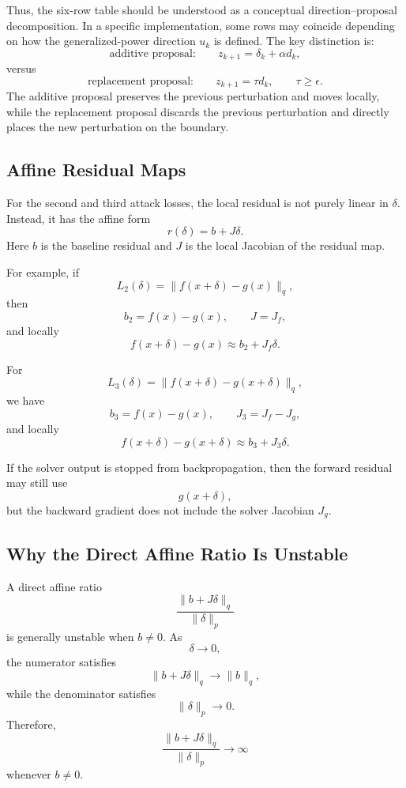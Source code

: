 \documentclass{article}
\begin{document}
Thus, the six-row table should be understood as a conceptual direction--proposal decomposition. In a specific implementation, some rows may coincide depending on how the generalized-power direction \(u_k\) is defined. The key distinction is:
\[
\text{additive proposal:}
\qquad
z_{k+1}
=
\delta_k+\alpha d_k,
\]
versus
\[
\text{replacement proposal:}
\qquad
z_{k+1}
=
\tau d_k,
\qquad
\tau\ge\epsilon.
\]
The additive proposal preserves the previous perturbation and moves locally, while the replacement proposal discards the previous perturbation and directly places the new perturbation on the boundary.














\subsection{Affine Residual Maps}

For the second and third attack losses, the local residual is not purely linear in $\delta$. Instead, it has the affine form
\[
r(\delta)=b+J\delta.
\]
Here $b$ is the baseline residual and $J$ is the local Jacobian of the residual map.

For example, if
\[
L_2(\delta)
=
\|f(x+\delta)-g(x)\|_q,
\]
then
\[
b_2=f(x)-g(x),
\qquad
J=J_f,
\]
and locally
\[
f(x+\delta)-g(x)
\approx
b_2+J_f\delta.
\]

For
\[
L_3(\delta)
=
\|f(x+\delta)-g(x+\delta)\|_q,
\]
we have
\[
b_3=f(x)-g(x),
\qquad
J_3=J_f-J_g,
\]
and locally
\[
f(x+\delta)-g(x+\delta)
\approx
b_3+J_3\delta.
\]

If the solver output is stopped from backpropagation, then the forward residual may still use
\[
g(x+\delta),
\]
but the backward gradient does not include the solver Jacobian $J_g$.

\subsection{Why the Direct Affine Ratio Is Unstable}

A direct affine ratio
\[
\frac{\|b+J\delta\|_q}{\|\delta\|_p}
\]
is generally unstable when $b\neq0$. As
\[
\delta\to0,
\]
the numerator satisfies
\[
\|b+J\delta\|_q\to\|b\|_q,
\]
while the denominator satisfies
\[
\|\delta\|_p\to0.
\]
Therefore,
\[
\frac{\|b+J\delta\|_q}{\|\delta\|_p}
\to\infty
\]
whenever $b\neq0$.
\end{document}
